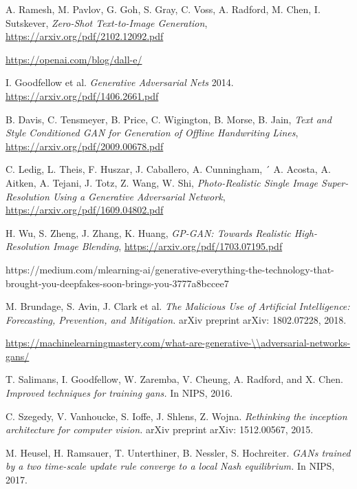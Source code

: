 \documentclass[11pt,a4paper,openany]{book}
\begin{document}
\begin{thebibliography}{a,b,c}

 A. Ramesh, M. Pavlov, G. Goh, S. Gray, C. Voss, A. Radford, M. Chen, I. Sutskever, {\it Zero-Shot Text-to-Image Generation}, \url{https://arxiv.org/pdf/2102.12092.pdf}

 \url{https://openai.com/blog/dall-e/}

 I. Goodfellow et al.  {\it Generative Adversarial Nets} 2014.  \url{https://arxiv.org/pdf/1406.2661.pdf}

 B. Davis, C. Tensmeyer, B. Price, C. Wigington, B. Morse, B. Jain,  {\it Text and Style Conditioned GAN for
Generation of Offline Handwriting Lines},  \url{https://arxiv.org/pdf/2009.00678.pdf}

 C. Ledig, L. Theis, F.  Huszar, J. Caballero, A. Cunningham, ´
A. Acosta, A. Aitken, A. Tejani, J. Totz, Z. Wang, W. Shi, {\it Photo-Realistic Single Image Super-Resolution Using a Generative Adversarial
Network}, \url{https://arxiv.org/pdf/1609.04802.pdf}

 H. Wu, S. Zheng, J. Zhang, K. Huang, {\it GP-GAN: Towards Realistic High-Resolution Image Blending}, \url{https://arxiv.org/pdf/1703.07195.pdf}

 https://medium.com/mlearning-ai/generative-everything-the-technology-that-brought-you-deepfakes-soon-brings-you-3777a8bccee7

 M. Brundage, S. Avin, J. Clark et al. {\it The Malicious Use of Artificial Intelligence: Forecasting, Prevention, and Mitigation.} arXiv preprint arXiv: 1802.07228, 2018.

 \url{https://machinelearningmastery.com/what-are-generative-\\adversarial-networks-gans/}

 T. Salimans, I. Goodfellow, W. Zaremba, V. Cheung, A. Radford, and X. Chen. {\it Improved techniques for training gans.} In NIPS, 2016.

 C. Szegedy, V. Vanhoucke, S. Ioffe, J. Shlens, Z. Wojna. {\it Rethinking the inception architecture for computer vision.} arXiv preprint arXiv: 1512.00567, 2015.

 M. Heusel, H. Ramsauer, T. Unterthiner, B. Nessler, S. Hochreiter. {\it GANs trained by a two time-scale update rule converge to a local Nash equilibrium.} In NIPS, 2017.


\end{thebibliography}
\end{document}
